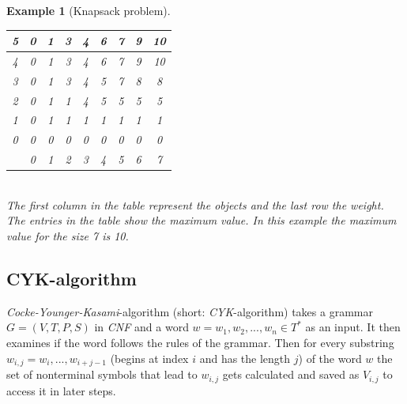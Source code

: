 \documentclass[a4paper, 11pt]{article}
\newtheorem*{example*}{Example}
\begin{document}
\begin{example*}[Knapsack problem]
\begin{minipage}{0.3\textwidth}
\end{minipage}\begin{minipage}{0.1\textwidth}
\ 
\end{minipage}\begin{minipage}{0.6\textwidth}

\begin{tabular}{|c||c|c|c|c|c|c|c|c|}
\hline
5 & 0 & 1 & 3 & 4 & 6 & 7 & 9 & 10 \\
\hline
4 & 0 & 1 & 3 & 4 & 6 & 7 & 9 & 10 \\
\hline
3 & 0 & 1 & 3 & 4 & 5 & 7 & 8 & 8 \\
\hline
2 & 0 & 1 & 1 & 4 & 5 & 5 & 5 & 5 \\
\hline
1 & 0 & 1 & 1 & 1 & 1 & 1 & 1 & 1 \\
\hline
0 & 0 & 0 & 0 & 0 & 0 & 0 & 0 & 0 \\
\hline
\hline
  & 0 & 1 & 2 & 3 & 4 & 5 & 6 & 7 \\
\hline

\end{tabular}

\end{minipage}
\ \\

The first column in the table represent the objects and the last row the weight. The entries in the table show the maximum value. In this example the maximum value for the size 7 is 10.


\end{example*}



\subsection{CYK-algorithm}
\label{cyk}


\textit{Cocke-Younger-Kasami}-algorithm (short: \textit{CYK}-algorithm) takes a grammar $G = (V, T, P, S)$ in \textit{CNF} and a word $w= w_1, w_2, ..., w_n \in T^*$ as an input. It then examines if the word follows the rules of the grammar. Then for every substring $w_{i, j} = w_i, ..., w_{i+j-1}$ (begins at index $i$ and has the length $j$) of the word $w$  the set of nonterminal symbols that lead to $w_{i, j}$ gets calculated and saved as $V_{i, j}$ to access it in later steps. \cite{CYK1}
\end{document}
